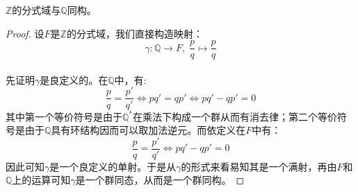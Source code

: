$\mathbb{Z}$的分式域与$\mathbb{Q}$同构。
\begin{proof}
设$F$是$\mathbb{Z}$的分式域，我们直接构造映射：
\[
\gamma \colon \mathbb{Q}\to F,\; \dfrac{p}{q}\mapsto \dfrac{p}{q}
\]
\\
\indent 先证明$\gamma$是良定义的。在$\mathbb{Q}$中，有:
\[
\frac{p}{q}=\frac{p'}{q'}\iff pq'=qp'\iff pq'-qp'=0
\]
\indent 其中第一个等价符号是由于$\mathbb{Q}^*$在乘法下构成一个群从而有消去律；第二个等价符号是由于$\mathbb{Q}$具有环结构因而可以取加法逆元。而依定义在$F$中有：
\[
\frac{p}{q}=\frac{p'}{q'}\iff pq'-qp'=0
\]
\indent 因此可知$\gamma$是一个良定义的单射。于是从$\gamma$的形式来看易知其是一个满射，再由$F$和$\mathbb{Q}$上的运算可知$\gamma$是一个群同态，从而是一个群同构。
\end{proof}

